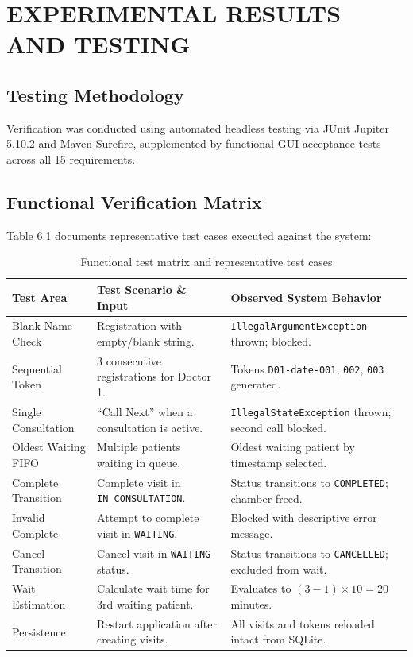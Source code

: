 \documentclass[12pt,a4paper,oneside]{report}
\begin{document}
\chapter{EXPERIMENTAL RESULTS AND TESTING}

\section{Testing Methodology}
Verification was conducted using automated headless testing via JUnit Jupiter 5.10.2 and Maven Surefire, supplemented by functional GUI acceptance tests across all 15 requirements.

\section{Functional Verification Matrix}
Table 6.1 documents representative test cases executed against the system:

\begin{table}[H]
\centering
\small
\begin{tabularx}{\textwidth}{p{2.8cm} X X}
\toprule
\textbf{Test Area} & \textbf{Test Scenario \& Input} & \textbf{Observed System Behavior} \\
\midrule
Blank Name Check & Registration with empty/blank string. & \texttt{IllegalArgumentException} thrown; blocked. \\
Sequential Token & 3 consecutive registrations for Doctor 1. & Tokens \texttt{D01-date-001}, \texttt{002}, \texttt{003} generated. \\
Single Consultation & ``Call Next'' when a consultation is active. & \texttt{IllegalStateException} thrown; second call blocked. \\
Oldest Waiting FIFO & Multiple patients waiting in queue. & Oldest waiting patient by timestamp selected. \\
Complete Transition & Complete visit in \texttt{IN\_CONSULTATION}. & Status transitions to \texttt{COMPLETED}; chamber freed. \\
Invalid Complete & Attempt to complete visit in \texttt{WAITING}. & Blocked with descriptive error message. \\
Cancel Transition & Cancel visit in \texttt{WAITING} status. & Status transitions to \texttt{CANCELLED}; excluded from wait. \\
Wait Estimation & Calculate wait time for 3rd waiting patient. & Evaluates to $(3-1) \times 10 = 20$ minutes. \\
Persistence & Restart application after creating visits. & All visits and tokens reloaded intact from SQLite. \\
\bottomrule
\end{tabularx}
\caption{Functional test matrix and representative test cases}
\end{table}
\end{document}
